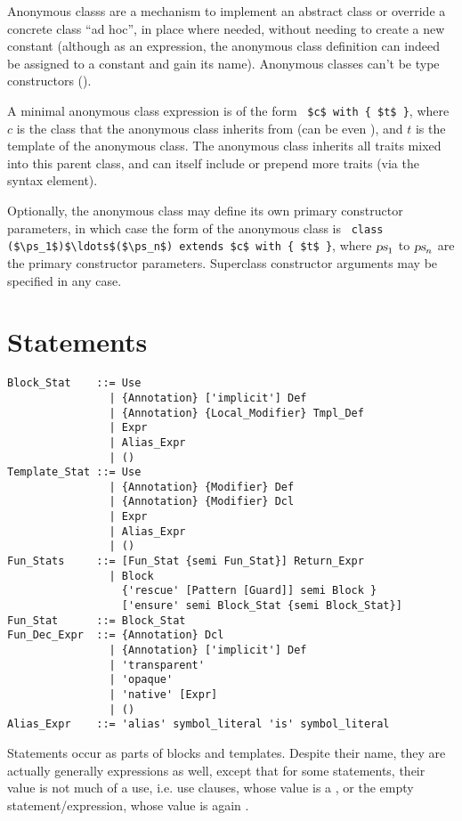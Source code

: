 Anonymous classs are a mechanism to implement an abstract class or override a concrete class ``ad hoc'', in place where needed, without needing to create a new constant (although as an expression, the anonymous class definition can indeed be assigned to a constant and gain its name). Anonymous classes can't be type constructors (). 

A minimal anonymous class expression is of the form ~\lstinline!$c$ with { $t$ }!, where $c$ is the class that the anonymous class inherits from (can be even ), and $t$ is the template of the anonymous class. The anonymous class inherits all traits mixed into this parent class, and can itself include or prepend more traits (via the  syntax element). 

Optionally, the anonymous class may define its own primary constructor parameters, in which case the form of the anonymous class is ~\lstinline!class ($\ps_1$)$\ldots$($\ps_n$) extends $c$ with { $t$ }!, where $\mbox{\sl ps}_1$ to $\mbox{\sl ps}_n$ are the primary constructor parameters. Superclass constructor arguments may be specified in any case. 






\section{Statements}

\syntax\begin{lstlisting}
Block_Stat    ::= Use
                | {Annotation} ['implicit'] Def
                | {Annotation} {Local_Modifier} Tmpl_Def
                | Expr
                | Alias_Expr
                | ()
Template_Stat ::= Use
                | {Annotation} {Modifier} Def
                | {Annotation} {Modifier} Dcl
                | Expr
                | Alias_Expr
                | ()
Fun_Stats     ::= [Fun_Stat {semi Fun_Stat}] Return_Expr
                | Block
                  {'rescue' [Pattern [Guard]] semi Block }
                  ['ensure' semi Block_Stat {semi Block_Stat}]
Fun_Stat      ::= Block_Stat
Fun_Dec_Expr  ::= {Annotation} Dcl
                | {Annotation} ['implicit'] Def
                | 'transparent'
                | 'opaque'
                | 'native' [Expr]
                | ()
Alias_Expr    ::= 'alias' symbol_literal 'is' symbol_literal
\end{lstlisting}

Statements occur as parts of blocks and templates. Despite their name, they are actually generally expressions as well, except that for some statements, their value is not much of a use, i.e. use clauses, whose value is a , or the empty statement/expression, whose value is again . 


